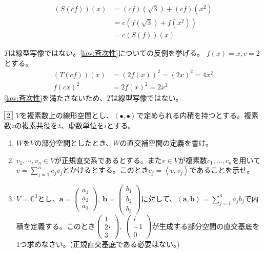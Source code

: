 \documentclass[dvipdfmx]{jsreport}
\newcommand{\C}{\mathbb{C}}
\newcommand{\innerproduct}[2]{\left\langle{#1}, {#2}\right\rangle}
\renewcommand{\bar}[1]{\overline{#1}} %
\newcounter{num}[section]
\begin{document}
\begin{answer}
\begin{enumerate}
\begin{enumerate_alpha}
\begin{enumerate_roman}
\begin{align*}
	(S(cf))(x)
	&= (cf)(\sqrt{3})+ (cf)(x^2)\\
	&= c(f(\sqrt{3})+ f(x^2))\\
	&= c(S(f))(x)
\end{align*}
\end{enumerate_roman}
	\item $T$は線型写像ではない。\ref{law:斉次性}についての反例を挙げる。
	$f(x)= x, c= 2$とする。
\begin{align*}
	(T(cf))(x)&= (2f(x))^2= (2x)^2= 4x^2\\
	f(cx)^2&= 2f(x)^2= 2x^2
\end{align*}
	\ref{law:斉次性}を満たさないため、$T$は線型写像ではない。
\end{enumerate_alpha}
\end{enumerate}
\end{answer}

\begin{tcolorbox} %
	$\fbox{2}$ $V$を複素数上の線形空間とし、$\innerproduct{\bullet}{\bullet}$で定められる内積を持つとする。複素数$z$の複素共役を$\bar{z}$、虚数単位を$i$とする。

\begin{enumerate}
	\item $W$を$V$の部分空間としたとき、$W$の直交補空間の定義を書け。
	\item $v_1, \cdots, v_n\in V$が正規直交系であるとする。また$v\in V$が複素数$c_1, \ldots, c_n$を用いて$v= \sum_{j= 1}^n c_j v_j$とかけるとする。このとき$c_j= \innerproduct{v}{v_j}$であることを示せ。
	\item $V= \C^3$とし、$\bm{a}= \begin{pmatrix}a_1\\ a_2\\ a_3\end{pmatrix},\ \bm{b}= \begin{pmatrix}b_1\\ b_2\\ b_3\end{pmatrix}$に対して、$\innerproduct{\bm{a}}{\bm{b}}= \sum_{j= 1}^3 a_j\bar{b_j}$で内積を定義する。このとき$\begin{pmatrix}1\\ 2i\\ 3\end{pmatrix},\ \begin{pmatrix}i\\ -1\\ 0\end{pmatrix}$が生成する部分空間の直交基底を1つ求めなさい。(正規直交基底である必要はない。)
\end{enumerate}
\end{tcolorbox}
\end{document}

